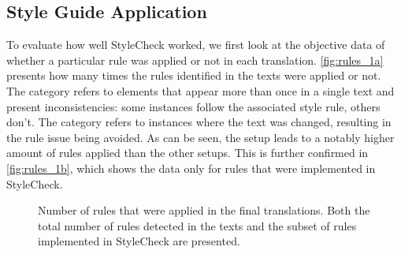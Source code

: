 \subsection{Style Guide Application}

\noindent To evaluate how well StyleCheck worked, we first look at the objective data of whether a particular rule was applied or not in each translation. \autoref{fig:rules_1a} presents how many times the rules identified in the texts were applied or not. The  category refers to elements that appear more than once in a single text and present inconsistencies: some instances follow the associated style rule, others don't. The  category refers to instances where the text was changed, resulting in the rule issue being avoided. As can be seen, the \style setup leads to a notably higher amount of rules applied than the other setups. This is further confirmed in \autoref{fig:rules_1b}, which shows the data only for rules that were implemented in StyleCheck.

\begin{figure}[h]
\caption{Number of rules that were applied in the final translations. Both the total number of rules detected in the texts and the subset of rules implemented in StyleCheck are presented.}
\label{fig:rules_1}
\end{figure}

